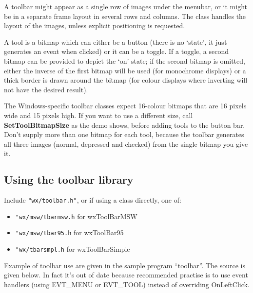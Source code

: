 A toolbar might appear as a single row of images under
the menubar, or it might be in a separate frame layout in several rows
and columns. The class handles the layout of the images, unless explicit
positioning is requested.

A tool is a bitmap which can either be a button (there is no `state',
it just generates an event when clicked) or it can be a toggle. If a
toggle, a second bitmap can be provided to depict the `on' state; if
the second bitmap is omitted, either the inverse of the first bitmap
will be used (for monochrome displays) or a thick border is drawn
around the bitmap (for colour displays where inverting will not have
the desired result).

The Windows-specific toolbar classes expect 16-colour bitmaps that are 16 pixels wide and 15 pixels
high. If you want to use a different size, call {\bf SetToolBitmapSize}\rtfsp
as the demo shows, before adding tools to the button bar. Don't supply more than
one bitmap for each tool, because the toolbar generates all three images (normal,
depressed and checked) from the single bitmap you give it.

\subsection{Using the toolbar library}

Include {\tt "wx/toolbar.h"}, or if using a class directly, one of:

\begin{itemize}\itemsep=0pt
\item {\tt "wx/msw/tbarmsw.h} for wxToolBarMSW
\item {\tt "wx/msw/tbar95.h} for wxToolBar95
\item {\tt "wx/tbarsmpl.h} for wxToolBarSimple
\end{itemize}

Example of toolbar use are given in the sample program ``toolbar''. The
source is given below. In fact it's out of date because recommended
practise is to use event handlers (using EVT\_MENU or EVT\_TOOL) instead of
overriding OnLeftClick.

